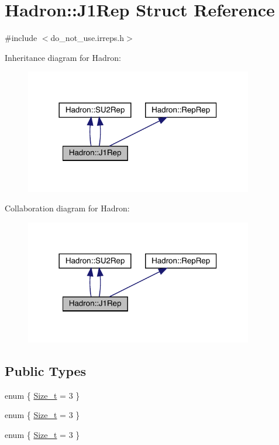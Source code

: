 \hypertarget{structHadron_1_1J1Rep}{}\section{Hadron\+:\+:J1\+Rep Struct Reference}
\label{structHadron_1_1J1Rep}


{\ttfamily \#include $<$do\+\_\+not\+\_\+use.\+irreps.\+h$>$}



Inheritance diagram for Hadron\+:\nopagebreak
\begin{figure}[H]
\begin{center}
\leavevmode
\includegraphics[width=282pt]{df/ddf/structHadron_1_1J1Rep__inherit__graph}
\end{center}
\end{figure}


Collaboration diagram for Hadron\+:\nopagebreak
\begin{figure}[H]
\begin{center}
\leavevmode
\includegraphics[width=282pt]{d1/de1/structHadron_1_1J1Rep__coll__graph}
\end{center}
\end{figure}
\subsection*{Public Types}
\begin{DoxyCompactItemize}
\item 
enum \{ \mbox{\hyperlink{structHadron_1_1J1Rep_a0174e494448141764b3209209619382fa4f0d9bc3adf30bfbce6f630003d386c8}{Size\+\_\+t}} = 3
 \}
\item 
enum \{ \mbox{\hyperlink{structHadron_1_1J1Rep_a0174e494448141764b3209209619382fa4f0d9bc3adf30bfbce6f630003d386c8}{Size\+\_\+t}} = 3
 \}
\item 
enum \{ \mbox{\hyperlink{structHadron_1_1J1Rep_a0174e494448141764b3209209619382fa4f0d9bc3adf30bfbce6f630003d386c8}{Size\+\_\+t}} = 3
 \}
\end{DoxyCompactItemize}
